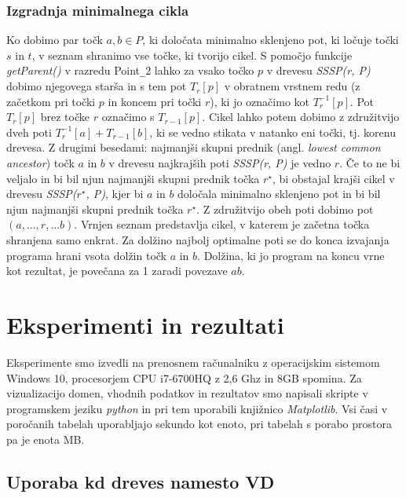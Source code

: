 \documentclass[a4paper, 12pt]{book}
\newcommand{\U}{\texttt{\_}}
\begin{document}
\subsection{Izgradnja minimalnega cikla}
Ko dobimo par točk $a, b\in P$, ki določata minimalno sklenjeno pot, ki ločuje točki $s$ in $t$, v seznam shranimo vse točke, ki tvorijo cikel. S pomočjo funkcije \textit{getParent()} v razredu Point\U 2 lahko za vsako točko $p$ v drevesu \textit{SSSP(r, P)} dobimo njegovega starša in s tem pot $T_r[p]$ v obratnem vrstnem redu (z začetkom pri točki $p$ in koncem pri točki $r$), ki jo označimo kot $T_r^{-1}[p]$. Pot $T_r[p]$ brez točke $r$ označimo s $T_{r-1}[p]$. Cikel lahko potem dobimo z združitvijo dveh poti $T_r^{-1}[a] + T_{r-1}[b]$, ki se vedno stikata v natanko eni točki, tj. korenu drevesa. Z drugimi besedami: najmanjši skupni prednik (angl. \textit{lowest common ancestor}) točk $a$ in $b$ v drevesu najkrajših poti \textit{SSSP(r, P)} je vedno $r$. Če to ne bi veljalo in bi bil njun najmanjši skupni prednik točka $r^\star$, bi obstajal krajši cikel v drevesu \textit{SSSP($r^\star$, P)}, kjer bi $a$ in $b$ določala minimalno sklenjeno pot in bi bil njun najmanjši skupni prednik točka $r^\star$. Z združitvijo obeh poti dobimo pot $(a,...,r,...b)$. Vrnjen seznam predstavlja cikel, v katerem je začetna točka shranjena samo enkrat. Za dolžino najbolj optimalne poti se do konca izvajanja programa hrani vsota dolžin točk $a$ in $b$. Dolžina, ki jo program na koncu vrne kot rezultat, je povečana za 1 zaradi povezave $ab$. 


\chapter{Eksperimenti in rezultati}
\label{Rezultati}
Eksperimente smo izvedli na prenosnem računalniku z operacijskim sistemom Windows 10, procesorjem CPU i7-6700HQ z 2,6 Ghz in 8GB spomina. Za vizualizacijo domen, vhodnih podatkov in rezultatov smo napisali skripte v programskem jeziku \textit{python} in pri tem uporabili knjižnico \textit{Matplotlib}. Vsi časi v poročanih tabelah uporabljajo sekundo kot enoto, pri tabelah s porabo prostora pa je enota MB.
\section{Uporaba kd dreves namesto VD}
\end{document}
